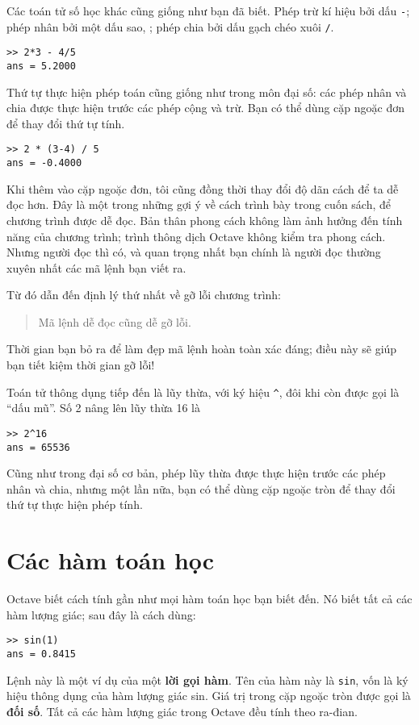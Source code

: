 \documentclass[12pt]{book}
\begin{document}
Các toán tử số học khác cũng giống như bạn đã biết. Phép trừ kí hiệu 
bởi dấu {\tt -}; phép nhân bởi một dấu sao, {\tt *}; phép chia bởi dấu 
gạch chéo xuôi {\tt /}.

\begin{verbatim}
>> 2*3 - 4/5
ans = 5.2000
\end{verbatim}
%
Thứ tự thực hiện phép toán cũng giống như trong môn đại số: các phép 
nhân và chia được thực hiện trước các phép cộng và trừ. Bạn có thể dùng
cặp ngoặc đơn để thay đổi thứ tự tính.

\begin{verbatim}
>> 2 * (3-4) / 5
ans = -0.4000
\end{verbatim}
%
Khi thêm vào cặp ngoặc đơn, tôi cũng đồng thời thay đổi độ dãn cách
để ta dễ đọc hơn. Đây là một trong những gợi ý về cách trình bày trong
cuốn sách, để chương trình được dễ đọc. Bản thân phong cách không
làm ảnh hưởng đến tính năng của chương trình; trình thông dịch Octave
không kiểm tra phong cách. Nhưng người đọc thì có, và quan trọng nhất
bạn chính là người đọc thường xuyên nhất các mã lệnh bạn viết ra. 

Từ đó dẫn đến định lý thứ nhất về gỡ lỗi chương trình:

\begin{quote}
Mã lệnh dễ đọc cũng dễ gỡ lỗi.
\end{quote}

Thời gian bạn bỏ ra để làm đẹp mã lệnh hoàn toàn xác đáng; điều này sẽ giúp
bạn tiết kiệm thời gian gỡ lỗi!

Toán tử thông dụng tiếp đến là lũy thừa, với ký hiệu \verb+^+,
đôi khi còn được gọi là ``dấu mũ''. Số 2 nâng lên lũy thừa 16 là

\begin{verbatim}
>> 2^16
ans = 65536
\end{verbatim}
%
Cũng như trong đại số cơ bản, phép lũy thừa được thực hiện trước các phép 
nhân và chia, nhưng một lần nữa, bạn có thể dùng cặp ngoặc tròn để thay
đổi thứ tự thực hiện phép tính.


\section{Các hàm toán học}

Octave biết cách tính gần như mọi hàm toán học bạn biết đến. Nó
biết tất cả các hàm lượng giác; sau đây là cách dùng:

\begin{verbatim}
>> sin(1)
ans = 0.8415
\end{verbatim}
%
Lệnh này là một ví dụ của một {\bf lời gọi hàm}. Tên của hàm này là
{\tt sin}, vốn là ký hiệu thông dụng của hàm lượng giác sin. Giá trị trong
cặp ngoặc tròn được gọi là {\bf đối số}. Tất cả các hàm lượng giác 
trong Octave đều tính theo ra-đian.
\end{document}
